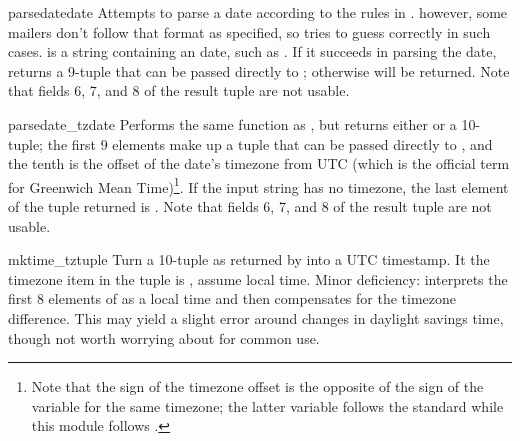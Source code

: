 \begin{funcdesc}{parsedate}{date}
Attempts to parse a date according to the rules in .
however, some mailers don't follow that format as specified, so
 tries to guess correctly in such cases. 
 is a string containing an  date, such as 
.  If it succeeds in parsing
the date,  returns a 9-tuple that can be passed
directly to ; otherwise  will be
returned.  Note that fields 6, 7, and 8 of the result tuple are not
usable.
\end{funcdesc}

\begin{funcdesc}{parsedate_tz}{date}
Performs the same function as , but returns
either  or a 10-tuple; the first 9 elements make up a tuple
that can be passed directly to , and the tenth
is the offset of the date's timezone from UTC (which is the official
term for Greenwich Mean Time)\footnote{Note that the sign of the timezone
offset is the opposite of the sign of the 
variable for the same timezone; the latter variable follows the
\POSIX{} standard while this module follows .}.  If the input
string has no timezone, the last element of the tuple returned is
.  Note that fields 6, 7, and 8 of the result tuple are not
usable.
\end{funcdesc}

\begin{funcdesc}{mktime_tz}{tuple}
Turn a 10-tuple as returned by  into a UTC
timestamp.  It the timezone item in the tuple is , assume
local time.  Minor deficiency:  interprets the
first 8 elements of  as a local time and then compensates
for the timezone difference.  This may yield a slight error around
changes in daylight savings time, though not worth worrying about for
common use.
\end{funcdesc}


